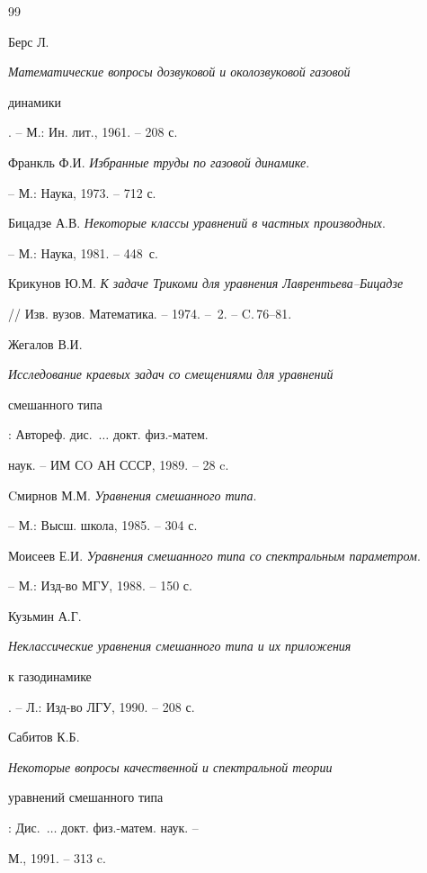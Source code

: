 \begin{thebibliography}{99}







Берс Л. {\em Математические вопросы дозвуковой и околозвуковой газовой


динамики}. -- М.: Ин. лит., 1961. -- 208 с.




Франкль Ф.И. {\em Избранные труды по газовой динамике}.


-- М.: Наука, 1973. -- 712 с.




Бицадзе А.В. {\em Некоторые классы уравнений в частных производных}.


-- М.: Наука, 1981. -- 448~с.




Крикунов Ю.М. {\em К задаче Трикоми для уравнения Лаврентьева--Бицадзе}


// Изв. вузов. Математика. -- 1974. -- \No\,2. -- C.\,76--81. 




Жегалов В.И. {\em Исследование краевых задач со смещениями для уравнений 


смешанного типа}: Автореф. дис.~$\dotsc$ докт. физ.-матем.


наук. -- ИМ СO АН СССР, 1989. -- 28 c.




Cмирнов М.М. {\em Уравнения смешанного типа}.


-- М.: Высш. школа, 1985. -- 304 с.




Моисеев Е.И. {\em Уравнения смешанного типа со спектральным параметром}.


-- М.: Изд-во МГУ, 1988. -- 150 с.




Кузьмин А.Г. {\em Неклассические уравнения смешанного типа и их приложения


к газодинамике}. -- Л.: Изд-во ЛГУ, 1990. -- 208 с.




Сабитов К.Б. {\em Некоторые вопросы качественной и спектральной теории


уравнений смешанного типа}: Дис.~$\dotsc$ докт. физ.-матем. наук. --


М., 1991. -- 313 c.



\end{thebibliography}
